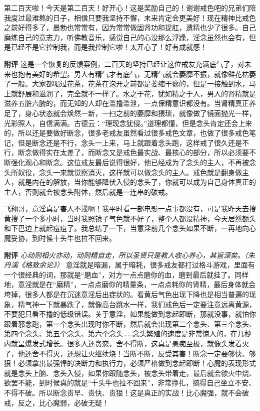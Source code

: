 \begin{case}
    第二百天啦！今天是第二百天！好开心！这是奖励自己的！谢谢戒色吧的兄弟们陪我度过最难熬的日子，相信只要我坚持不懈，未来肯定会更美好！现在精神比戒色之前好得多了，晨勃也常常有，因为常常做固肾功和提肛，遗精也少了很多。自己磨练自己的意志力，听佛教音乐，感觉自己的心没那么浮躁，淫念虽然也会有，但是已经不是它控制我，而是我控制它啦！太开心了！好有成就感！

    \textbf{附评} 这是一个恢复的反馈案例，二百天的坚持已经让这位戒友充满底气了，对未来也抱有美好的希望。男人有精气才有底气，无精气就会萎靡不振，就像鲜花枯萎了一般。大家都喝过花茶，花茶在泡开之前都是萎缩干瘪的，但是一接触到水，马上就舒展和滋润了，完全就不一样了。水之于花，犹如精之于人，男人的肾精就是滋养五脏六腑的，而无知的人却在滥撸滥泄，一点保精意识都没有。当肾精真正养足了，身心状态就会焕然一新，一扫之前的萎靡和猥琐，就像做了镜面抛光一样，光彩照人，自信满满。古德云：“理现念犹侵。”道理都懂，但是念头肯定还会上来的，所以还是要做好断念，很多老戒友虽然看过很多戒色文章，也做了很多戒色笔记，但是断念还是不行，念头一上来，马上就跟着念头跑，这样戒了很久还是不行，断念做得实在太差了，而断念又是戒色最实战、最核心的部分，所以必须要不断强化观心和断念。这位戒友最后说得很好，他已经成为了念头的主人，不再被念头所奴役，念头一来就觉察消灭，这样就可以做念头的主人。戒色就是翻身做主人，就是内在的解放，当你能够降伏入侵的念头了，你就可以成为自己身体真正的主人，否则就会被念头附体，然后就是一连串的破戒。
\end{case}

\begin{case}
    飞翔哥，意淫真是害人不浅啊！我平时看一部电影一点事都没有，可是我昨天去搜黄搜了一个多小时，当时我照镜子气色就不好了，整个人都没精神，今天居然额头和下巴边上就起痘痘了。我总结了一下，当意淫前几个念头如果不断，一再地向心魔妥协，到时候十头牛也拉不回来。

    \textbf{附评} \textit{心动则相火亦动，动则精自走，所以圣贤只是教人收心养心，其旨深矣。（朱丹溪《格致余论》）} 意淫就是暗漏，属于暗耗，很多戒友都打过格斗游戏，里面有一个很经典的词，那就是“磨血”，对方一点点磨你的血，磨到最后就挂了。同样地，意淫就是在“磨精”，一点点磨你的精量条，一点点耗你的肾精，最后身体就会垮掉，很多人都是在沉迷意淫后出症状的。看黄后气色出现下降也是相当普遍的现象，精气神一下就暴跌了，就像高台跳水一样，我们戒色后一定要注意远离黄源，不要犯只看不撸的低级错误。关于意淫，如果能做到念起即断，那就没事，就怕你跟着邪念跑，第一个念头出现时你不断，然后就会出现第二个念头、第三个念头、第四个念头、第五个念头、第六个念头……念头繁殖的速度是非常惊人的，在几秒内就呈爆发式增长。很多人还贪恋，舍不得断，这真是愚痴至极，就像头发着火了，他还舍不得灭，还想让火继续烧！当断不断，反受其害！断念一定要够快、够狠！必须拿出最强悍的决断力和执行力，必须严格做到念起即断！心魔的表现形式就是念头上脑、念头入侵，如果你跟随念头，被念头带着走，最后就会欲火中烧、欲罢不能，到时候真的就是“十头牛也拉不回来”，非常挣扎，搞得自己坐立不安、不得不破。所以断念贵早、贵快、贵狠！这是真正的实战！比心魔强，就不会破戒，反之，比心魔弱，必破无疑！
\end{case}

